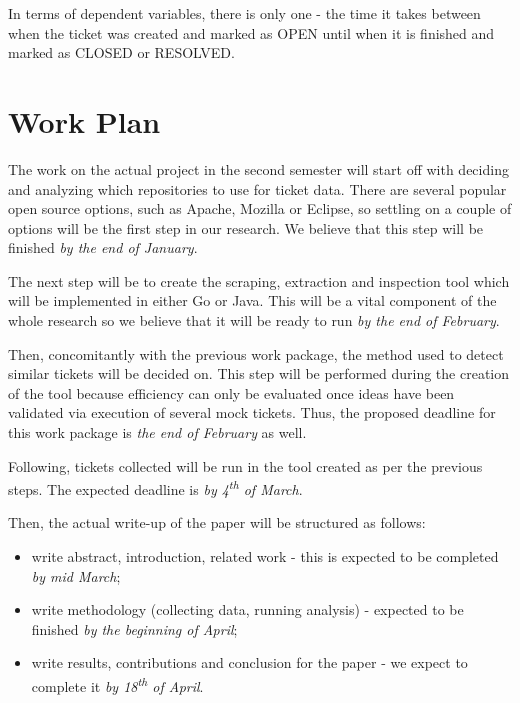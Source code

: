 \documentclass{mprop}
\begin{document}
In terms of dependent variables, there is only one - the time it takes
between when the ticket was created and marked as OPEN until when it
is finished and marked as CLOSED or RESOLVED.

\section{Work Plan}\label{work_plan}

The work on the actual project in the second semester will start off 
with deciding and analyzing which repositories to use for ticket data.
There are several popular open source options, such as Apache, Mozilla or
Eclipse, so settling on a couple of options will be the first step in our
research. We believe that this step will be finished \emph{by the end of
January}.

The next step will be to create the scraping, extraction and inspection
tool which will be implemented in either Go or Java. This will be a vital
component of the whole research so we believe that it will be ready to run
\emph{by the end of February}.

Then, concomitantly with the previous work package, the method used to 
detect similar tickets will be decided on. This step will be performed
during the creation of the tool because efficiency can only be evaluated
once ideas have been validated via execution of several mock tickets. 
Thus, the proposed deadline for this work package is \emph{the end of February} as well.

Following, tickets collected will be run in the tool created as per the previous steps. 
The expected deadline is \emph{by 4\textsuperscript{th} of March}.

Then, the actual write-up of the paper will be structured as follows:
  \begin{itemize}
    \item write abstract, introduction, related work - this is expected
      to be completed \emph{by mid March};
    \item write methodology (collecting
      data, running analysis) - expected to be finished \emph{by the 
      beginning of April};
    \item write results, contributions and conclusion for the paper - 
      we expect to complete it \emph{by 18\textsuperscript{th} of April}.
  \end{itemize}


\end{document}
